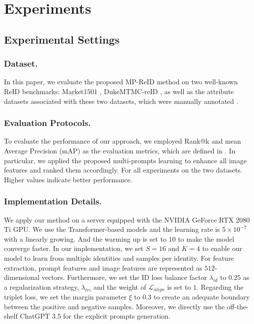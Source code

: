 \documentclass[letterpaper]{article} %
\begin{document}
\section{Experiments}

\subsection{Experimental Settings}\label{expd}

\subsubsection{\textbf{Dataset.}} In this paper, we evaluate the proposed MP-ReID method on two well-known ReID benchmarks: Market1501 \cite{zheng2015scalable}, DukeMTMC-reID \cite{zheng2017unlabeled}, as well as the attribute datasets associated with these two datasets, which were manually annotated \cite{lin2019improving}.

\subsubsection{\textbf{Evaluation Protocols.}} To evaluate the performance of our approach, we employed Rank@k and mean Average Precision (mAP) as the evaluation metrics, which are defined in \cite{wang2021beyond,farooq2022axm}. In particular, we applied the proposed multi-prompts learning to enhance all image features and ranked them accordingly. For all experiments on the two datasets. Higher values indicate better performance.
\subsubsection{\textbf{Implementation Details.}}
We apply our method on a server equipped with the NVIDIA GeForce RTX 2080 Ti GPU. We use the Transformer-based models and the learning rate is $5 \times 10^{-7}$ with a linearly growing. And the warming up is set to $10$ to make the model converge faster. In our implementation, we set $S = 16$ and $K = 4$ to enable our model to learn from multiple identities and samples per identity. For feature extraction, prompt features and image features are represented as $512$-dimensional vectors. Furthermore, we set the ID loss balance factor $\lambda_{id}$ to $0.25$ as a regularization strategy, $\lambda_{tri}$ and the weight of $\mathcal{L}_{align}$ is set to $1$. Regarding the triplet loss, we set the margin parameter $\xi$ to $0.3$ to create an adequate boundary between the positive and negative samples. Moreover, we directly use the off-the-shelf ChatGPT 3.5 for the explicit prompts generation.
\end{document}
